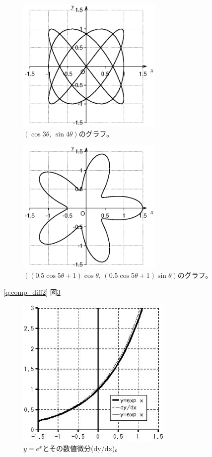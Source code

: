 \begin{figure}[!h]
    \centering
    \includegraphics[width=7.0cm]{cmp_Lissajous.eps}
    \caption{$(\cos 3\theta,\,  \sin 4\theta)$のグラフ。\label{fig:cmp_Lissajous}}
\end{figure}

\begin{figure}[!h]
    \centering
    \includegraphics[width=7.0cm]{cmp_Hitode.eps}
    \caption{$((0.5\cos 5\theta+1) \cos \theta,\, (0.5\cos 5\theta+1) \sin \theta)$のグラフ。\label{fig:cmp_Hitode}}
\end{figure}



\ref{q:comp_diff2}  図\ref{fig:graph_expxdiff}
\begin{figure}[!h]
    \centering
    \includegraphics[width=7.5cm]{graph_expxdiff.eps}
    \caption{$y=e^x$とその数値微分(dy/dx)。\label{fig:graph_expxdiff}}
\end{figure}

